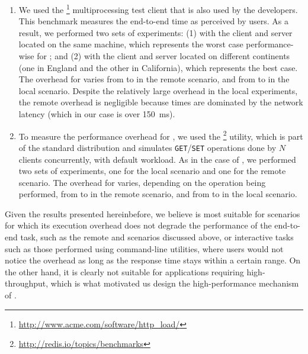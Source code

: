 \begin{enumerate}
\item[\lighttpd] We used the
  \httpload\footnote{\url{http://www.acme.com/software/http_load/}}
  multiprocessing test client that is also used by the \lighttpd developers.
  This benchmark measures the end-to-end time as perceived by users. As a
  result, we performed two sets of experiments: (1) with the client and server
  located on the same machine, which represents the worst case performance-wise
  for \mx; and (2) with the client and server located on different continents
  (one in England and the other in California), which represents the best case.
  The overhead for \lighttpd varies from \minLighttpdRemote to
  \maxLighttpdRemote in the remote scenario, and from \minLighttpdOver to
  \maxLighttpdOver in the local scenario.  Despite the relatively large
  overhead in the local experiments, the remote overhead is negligible because
  times are dominated by the network latency (which in our case is over
  \SI{150}{\milli\second}).

\item[\redis] To measure the performance overhead for \redis, we used the
  \redisbenchmark\footnote{\url{http://redis.io/topics/benchmarks}} utility,
  which is part of the standard \redis distribution and simulates
  \lstinline`GET`/\lstinline`SET` operations done by $N$ clients concurrently, with
  default workload. As in the case of \lighttpd, we performed two sets of
  experiments, one for the local scenario and one for the remote scenario. The
  overhead for \redis varies, depending on the operation being performed, from
  \minRedisRemote to \maxRedisRemote in the remote scenario, and from
  \minRedisOver to \maxRedisOver in the local scenario. 

\end{enumerate}

Given the results presented hereinbefore, we believe \mx is most suitable for
scenarios for which its execution overhead does not degrade the performance of
the end-to-end task, such as the remote \redis and \lighttpd scenarios
discussed above, or interactive tasks such as those performed using
command-line utilities, where users would not notice the overhead as long as
the response time stays within a certain range. On the other hand, it is
clearly not suitable for applications requiring high-throughput, which is what
motivated us design the high-performance mechanism of \varan.


